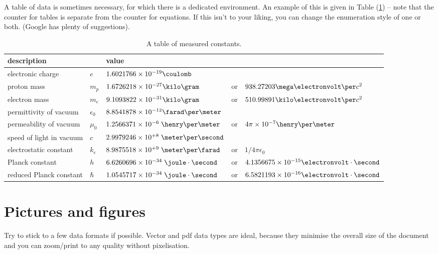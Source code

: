 A table of data is sometimes necessary, for which there is a dedicated environment. An example of this is given in Table (\ref{tab:measuredconstants}) -- note that the counter for tables is separate from the counter for equations. If this isn't to your liking, you can change the enumeration style of one or both. (Google has plenty of suggestions).

\begin{table}[h!]
\begin{center}
\begin{tabular}{ l l l c l}\hline
\textbf{description}  & \textbf{} & \textbf{value} \\ \hline
electronic charge & $e$ & $1.6021766 \times 10^{-19} \coulomb$ \\
proton mass            & $m_{p}$ & $1.6726218 \times 10^{-27} \kilo\gram$ &  
 or & $938.27203 \mega\electronvolt\per c^{2}$ \\
electron mass          & $m_{e}$ & $9.1093822 \times 10^{-31} \kilo\gram$ & or & $510.99891 \kilo\electronvolt\per c^{2}$ \\
permittivity of vacuum & $\epsilon_{0}$ & $8.8541878 \times 10^{-12} \farad\per\meter $ \\
permeability of vacuum & $\mu_{0}$         & $1.2566371 \times 10^{-6} \; \henry\per\meter$ & 
 or & $4 \pi \times 10^{-7} \henry\per\meter $ \\
speed of light in vacuum & $c$               & $2.9979246 \times 10^{+8} \; \meter\per\second $ \\ 
electrostatic constant   & $k_{e}$ & $8.9875518 \times 10^{+9} \; \meter\per\farad$ & 
 or & $1/4 \pi \epsilon_{0}$ \\
Planck constant        & $h$ & $6.6260696 \times 10^{-34} \; \joule\cdot\second$ & 
 or & $4.1356675 \times 10^{-15} \electronvolt\cdot\second$ \\
reduced Planck constant        & $\hbar$ & $1.0545717 \times 10^{-34} \; \joule\cdot\second$ & 
 or & $6.5821193 \times 10^{-16} \electronvolt\cdot\second$ \\
\hline
\end{tabular}
\end{center}
\caption{A table of measured constants.}
\label{tab:measuredconstants}
\end{table}

\section{Pictures and figures}\label{sec:figures}
Try to stick to a few data formats if possible. Vector and pdf data types are ideal, because they minimise the overall size of the document and you can zoom/print to any quality without pixelisation.\\

